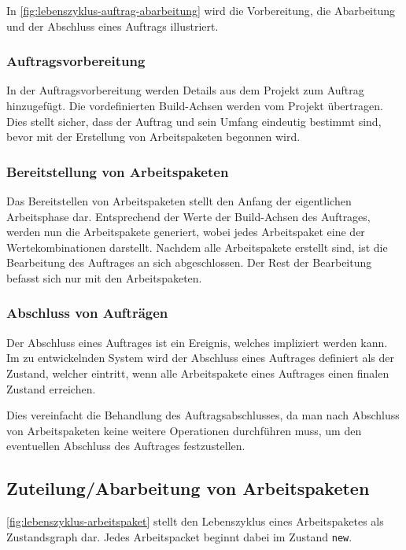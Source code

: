 In \cref{fig:lebenszyklus-auftrag-abarbeitung} wird die Vorbereitung, die Abarbeitung und der Abschluss eines Auftrags illustriert.


\subsubsection{Auftragsvorbereitung}

In der Auftragsvorbereitung werden Details aus dem Projekt zum Auftrag hinzugefügt.
Die vordefinierten Build-Achsen werden vom Projekt übertragen.
Dies stellt sicher, dass der Auftrag und sein Umfang eindeutig bestimmt sind,
bevor mit der Erstellung von Arbeitspaketen begonnen wird.


\subsubsection{Bereitstellung von Arbeitspaketen}

Das Bereitstellen von Arbeitspaketen stellt den Anfang der eigentlichen Arbeitsphase dar.
Entsprechend der Werte der Build-Achsen des Auftrages, werden nun die Arbeits\-pakete generiert,
wobei jedes Arbeitspaket eine der Wertekombinationen darstellt.
Nachdem alle Arbeitspakete erstellt sind, ist die Bearbeitung des Auftrages an sich abgeschlossen. Der Rest der Bearbeitung befasst sich nur mit den Arbeitspaketen.

\subsubsection{Abschluss von Aufträgen}

Der Abschluss eines Auftrages ist ein Ereignis, welches impliziert werden kann.
Im zu entwickelnden System wird der Abschluss eines Auftrages definiert
als der Zustand, welcher eintritt, wenn alle Arbeitspakete eines Auftrages
einen finalen Zustand erreichen.

Dies vereinfacht die Behandlung des Auftragsabschlusses,
da man nach Abschluss von Arbeitspaketen keine weitere Operationen durchführen muss,
um den eventuellen Abschluss des Auftrages festzustellen.

\subsection{Zuteilung/Abarbeitung von Arbeitspaketen}

\cref{fig:lebenszyklus-arbeitspaket} stellt den Lebenszyklus eines Arbeitspaketes als Zustandsgraph dar.
Jedes Arbeitspacket beginnt dabei im Zustand \verb|new|.


